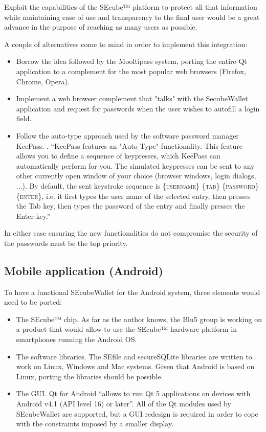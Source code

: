 Exploit the capabilities of the SEcube™ platform to protect all that information while maintaining ease of use and transparency to the final user would be a great advance in the purpose of reaching as many users as possible.

A couple of alternatives come to mind in order to implement this integration:
\begin{itemize}
\setlength\itemsep{-3pt}

\item Borrow the idea followed by the Mooltipass system, porting the entire Qt application to a complement for the most popular web browsers (Firefox, Chrome, Opera).
\item Implement a web browser complement that "talks" with the SecubeWallet application and request for passwords when the user wishes to autofill a login field.
\item Follow the auto-type approach used by the software password manager KeePass. \cite{autotype}. ``KeePass features an "Auto-Type" functionality. This feature allows you to define a sequence of keypresses, which KeePass can automatically perform for you. The simulated keypresses can be sent to any other currently open window of your choice (browser windows, login dialogs, ...). By default, the sent keystroke sequence is \{\textsc{username}\} \{\textsc{tab}\} \{\textsc{password}\} \{\textsc{enter}\}, i.e. it first types the user name of the selected entry, then presses the Tab key, then types the password of the entry and finally presses the Enter key.''
\end{itemize}

In either case ensuring the new functionalities do not compromise the security of the passwords must be the top priority.

\subsection{Mobile application (Android)}
To have a functional SEcubeWallet for the Android system, three elements would need to be ported:
\begin{itemize}
\item The SEcube™ chip. As far as the author knows, the Blu5 group is working on a product that would allow to use the SEcube™ hardware platform in smartphones running the Android OS.
\item The software libraries. The SEfile and secureSQLite libraries are written to work on Linux, Windows and Mac systems. Given that Android is based on Linux, porting the libraries should be possible.
\item The GUI. Qt for Android \cite{android} ``allows to run Qt 5 applications on devices with Android v4.1 (API level 16) or later''. All of the Qt modules used by SEcubeWallet are supported, but a GUI redesign is required in order to cope with the constraints imposed by a smaller display.
\end{itemize}


